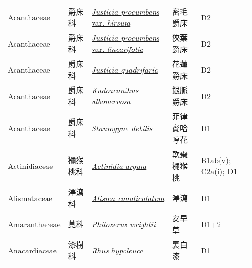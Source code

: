 {\begin{longtable}{L{2.5cm}L{2cm}L{5cm}L{2.5cm}L{3cm}}
    Acanthaceae & 爵床科 & \href{http://www.theplantlist.org/tpl1.1/search?q=Justicia+procumbens+var.+hirsuta}{\textit{Justicia procumbens} var. \textit{hirsuta} } & 密毛爵床 & D2    \\
    Acanthaceae & 爵床科 & \href{http://www.theplantlist.org/tpl1.1/search?q=Justicia+procumbens+var.+linearifolia}{\textit{Justicia procumbens} var. \textit{linearifolia} } & 狹葉爵床 & D2    \\
    Acanthaceae & 爵床科 & \href{http://www.theplantlist.org/tpl1.1/search?q=Justicia+quadrifaria}{\textit{Justicia quadrifaria} } & 花蓮爵床 & D2    \\
    Acanthaceae & 爵床科 & \href{http://www.theplantlist.org/tpl1.1/search?q=Kudoacanthus+albonervosa}{\textit{Kudoacanthus albonervosa} } & 銀脈爵床 & D2    \\
    Acanthaceae & 爵床科 & \href{http://www.theplantlist.org/tpl1.1/search?q=Staurogyne+debilis}{\textit{Staurogyne debilis} } & 菲律賓哈哼花 & D1    \\
    Actinidiaceae & 獼猴桃科 & \href{http://www.theplantlist.org/tpl1.1/search?q=Actinidia+arguta}{\textit{Actinidia arguta} } & 軟棗獼猴桃 & B1ab(v); C2a(i); D1    \\
    Alismataceae & 澤瀉科 & \href{http://www.theplantlist.org/tpl1.1/search?q=Alisma+canaliculatum}{\textit{Alisma canaliculatum} } & 澤瀉 & D1    \\
    Amaranthaceae & 莧科 & \href{http://www.theplantlist.org/tpl1.1/search?q=Philoxerus+wrightii}{\textit{Philoxerus wrightii} } & 安旱草 & D1+2    \\
    Anacardiaceae & 漆樹科 & \href{http://www.theplantlist.org/tpl1.1/search?q=Rhus+hypoleuca}{\textit{Rhus hypoleuca} } & 裏白漆 & D1    \\

\end{longtable}}
